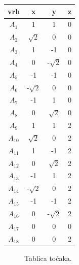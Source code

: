 \documentclass[a4paper,12pt]{article}
\begin{document}
\begin{center}
    \begin{tabular}{||c | c | c | c ||} 
     \hline
     vrh & x & y & z \\ [0.5ex] 
     \hline
     $A_1$ & 1 & 1 & 0  \\ 
     \hline
     $A_2$ & $\sqrt{2}$ & 0 & 0  \\
     \hline
     $A_3$ & 1 & -1 & 0  \\
     \hline
     $A_4$ & 0 & -$\sqrt{2}$ & 0 \\
     \hline
     $A_5$ & -1 & -1 & 0  \\ 
     \hline
     $A_6$ & -$\sqrt{2}$ & 0 & 0  \\
     \hline
     $A_7$ & -1 & 1 & 0  \\
     \hline
     $A_8$ & 0  & $\sqrt{2}$ & 0 \\
     \hline
     $A_9$ & 1 & 1 & 2  \\
     \hline
     $A_{10}$& $\sqrt{2}$ & 0 & 2 \\
     \hline
     $A_{11}$ & 1 & -1 & 2  \\
     \hline
     $A_{12}$ & 0 & $\sqrt{2}$ & 2 \\
     \hline
     $A_{13}$ & -1 & 1 & 2  \\ 
     \hline
     $A_{14}$ & -$\sqrt{2}$ & 0 & 2  \\
     \hline
     $A_{15}$ & -1 & -1 & 2  \\
     \hline
     $A_{16}$ & 0 & -$\sqrt{2}$ & 2  \\
     \hline
     $A_{17}$ & 0  & 0 & 0 \\
     \hline
     $A_{18}$ & 0 & 0  & 2\\ [1ex] 
     \hline
    \end{tabular}
    \end{center}

    \begin{figure}[ht]
        \centering
        \caption{Tablica točaka.}
    \end{figure}
\end{document}
